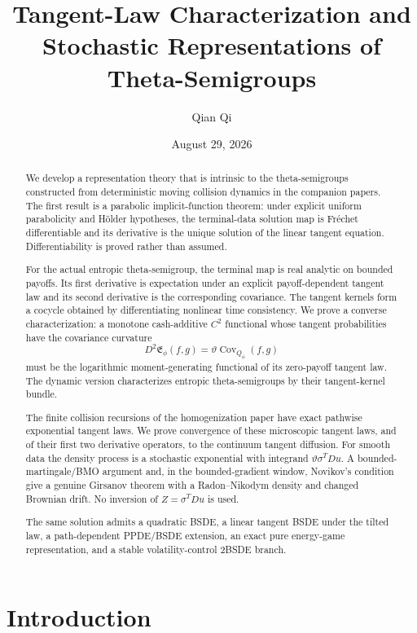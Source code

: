 \documentclass[11pt,reqno]{amsart}
\title[Tangent-law characterization and stochastic representations]{Tangent-Law Characterization and Stochastic Representations of Theta-Semigroups}
\author{Qian Qi}
\date{August 29, 2026}
\theoremstyle{definition}
\theoremstyle{remark}
\begin{document}
\begin{abstract}
We develop a representation theory that is intrinsic to the theta-semigroups
constructed from deterministic moving collision dynamics in the companion
papers.  The first result is a parabolic implicit-function theorem: under
explicit uniform parabolicity and H\"older hypotheses, the terminal-data
solution map is Fr\'echet differentiable and its derivative is the unique
solution of the linear tangent equation.  Differentiability is proved rather
than assumed.

For the actual entropic theta-semigroup, the terminal map is real analytic on
bounded payoffs.  Its first derivative is expectation under an explicit
payoff-dependent tangent law and its second derivative is the corresponding
covariance.  The tangent kernels form a cocycle obtained by differentiating
nonlinear time consistency.  We prove a converse characterization: a monotone
cash-additive $C^2$ functional whose tangent probabilities have the covariance
curvature
\[
 D^2\mathfrak E_\phi(f,g)
 =\vartheta\operatorname{Cov}_{Q_\phi}(f,g)
\]
must be the logarithmic moment-generating functional of its zero-payoff tangent
law.  The dynamic version characterizes entropic theta-semigroups by their
tangent-kernel bundle.

The finite collision recursions of the homogenization paper have exact
pathwise exponential tangent laws.  We prove convergence of these microscopic
tangent laws, and of their first two derivative operators, to the continuum
tangent diffusion.  For smooth data the density process is a stochastic
exponential with integrand $\vartheta\sigma^TDu$.  A bounded-martingale/BMO
argument and, in the bounded-gradient window, Novikov's condition give a
genuine Girsanov theorem with a Radon--Nikodym density and changed Brownian
drift.  No inversion of $Z=\sigma^TDu$ is used.

The same solution admits a quadratic BSDE, a linear tangent BSDE under the
tilted law, a path-dependent PPDE/BSDE extension, an exact pure energy-game
representation, and a stable volatility-control 2BSDE branch.
\end{abstract}

\maketitle
\tableofcontents

\section{Introduction}
\end{document}
